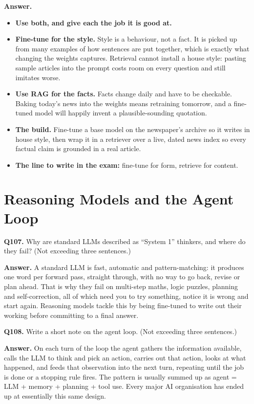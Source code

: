 \documentclass[11pt]{article}
\begin{document}
\textbf{Answer.}
\begin{itemize}
  \item \textbf{Use both, and give each the job it is good at.}
  \item \textbf{Fine-tune for the style.} Style is a behaviour, not a fact. It is picked up from many examples of how sentences are put together, which is exactly what changing the weights captures. Retrieval cannot install a house style: pasting sample articles into the prompt costs room on every question and still imitates worse.
  \item \textbf{Use RAG for the facts.} Facts change daily and have to be checkable. Baking today's news into the weights means retraining tomorrow, and a fine-tuned model will happily invent a plausible-sounding quotation.
  \item \textbf{The build.} Fine-tune a base model on the newspaper's archive so it writes in house style, then wrap it in a retriever over a live, dated news index so every factual claim is grounded in a real article.
  \item \textbf{The line to write in the exam:} fine-tune for form, retrieve for content.
\end{itemize}

\section{Reasoning Models and the Agent Loop}

\textbf{Q107.} Why are standard LLMs described as ``System 1'' thinkers, and where do they
fail? (Not exceeding three sentences.)

\textbf{Answer.} A standard LLM is fast, automatic and pattern-matching: it produces one word
per forward pass, straight through, with no way to go back, revise or plan ahead. That is why
they fail on multi-step maths, logic puzzles, planning and self-correction, all of which need
you to try something, notice it is wrong and start again. Reasoning models tackle this by
being fine-tuned to write out their working before committing to a final answer.

\medskip
\textbf{Q108.} Write a short note on the agent loop. (Not exceeding three sentences.)

\textbf{Answer.} On each turn of the loop the agent gathers the information available, calls
the LLM to think and pick an action, carries out that action, looks at what happened, and
feeds that observation into the next turn, repeating until the job is done or a stopping rule
fires. The pattern is usually summed up as agent = LLM + memory + planning + tool use. Every
major AI organisation has ended up at essentially this same design.
\end{document}
